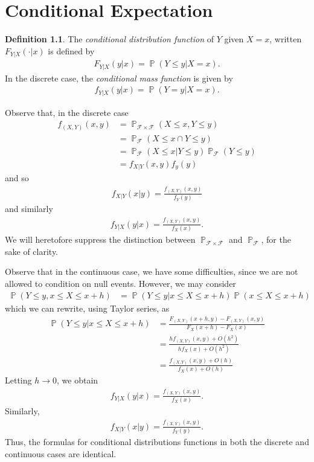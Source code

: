 \documentclass[12pt]{amsbook}
\newcommand{\filter}{\mathcal{F}}
\DeclareMathOperator{\prob}{\mathbb{P}}
\theoremstyle{plain}
\theoremstyle{definition}
\newtheorem*{definition}{Definition}
\theoremstyle{remark}
\numberwithin{equation}{section}  %
\begin{document}
	\chapter{Conditional Expectation}
	\begin{definition}
		The \emph{conditional distribution function} of $Y$ given $X = x$,
		written $F_{Y|X}(\cdot | x)$ is defined by
		\begin{align*}
			F_{Y|X}(y|x) = \prob (Y \le y | X = x).
		\end{align*}
		In the discrete case, the \emph{conditional mass function}
		is given by
		\begin{align*}
			f_{Y|X}(y|x) = \prob(Y = y | X = x).
		\end{align*}
	\end{definition}
	Observe that, in the discrete case
	\begin{align*}
		f_{(X,Y)}(x,y)
		& = \prob_{\filter \times \filter}(X \le x, Y \le y)
		\\
		& = \prob_{\filter} (X \le x \cap Y \le y)
		\\
		& = \prob_{\filter}(X \le x | Y \le y) \prob_{\filter}(Y \le y)
		\\
		& = f_{X|Y}	(x,y) f_y(y)	
	\end{align*}
	and so
	\begin{align*}
		f_{X|Y}(x|y) = \frac{f_{(X,Y)}(x,y)}{f_Y(y)}
	\end{align*}
	and similarly
	\begin{align*}
		f_{Y|X}(y|x) = \frac{f_{(X,Y)}(x,y)}{f_X(x)}.
	\end{align*}
	We will heretofore suppress the distinction between $\prob_{\filter \times
	\filter}$ and $\prob_{\filter}$, for the sake of clarity.

	Observe that in
	the continuous case, we have some difficulties,
	since we are not allowed to condition on null events. However, we may consider
	\begin{align*}
		\prob(Y \le y , x \le X \le x + h)
		& = \prob(Y \le y | x \le X \le x +h) \prob(x \le X \le x + h)
	\end{align*}
	which we can rewrite, using Taylor series, as
	\begin{align*}
		\prob(Y \le y | x \le X \le x + h)
		& = \frac{F_{(X,Y)}(x+h,y ) - F_{(X,Y)}(x,y )}{F_X(x+h) - F_X(x)}
		\\
		& = \frac{hf_{(X,Y)}(x,y) + O(h^2)}{hf_X(x) + O(h^2)}
		\\
		& = \frac{f_{(X,Y)}(x,y) + O(h)}{f_X(x) + O(h)}
	\end{align*}
	Letting $h \to 0$, we obtain
	\begin{align*}
		f_{Y|X}(y|x) = \frac{f_{(X,Y)}(x,y)}{f_X(x)}.
	\end{align*}
	Similarly, 
	\begin{align*}
		f_{X|Y}(x|y) = \frac{f_{(X,Y)}(x,y)}{f_Y(y)}.
	\end{align*}
	Thus, the formulas for conditional distributions
	functions in both the discrete and continuous cases are identical.
\end{document}
